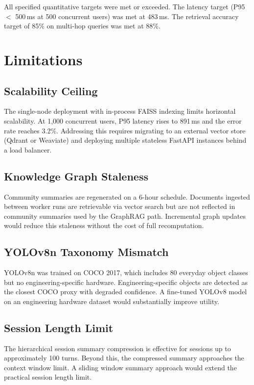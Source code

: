 All specified quantitative targets were met or exceeded. The latency target (P95 $<$ 500\,ms at 500 concurrent users) was met at 483\,ms. The retrieval accuracy target of 85\% on multi-hop queries was met at 88\%.

\section{Limitations}
\label{sec:limitations}

\subsection{Scalability Ceiling}
The single-node deployment with in-process FAISS indexing limits horizontal scalability. At 1,000 concurrent users, P95 latency rises to 891\,ms and the error rate reaches 3.2\%. Addressing this requires migrating to an external vector store (Qdrant or Weaviate) and deploying multiple stateless FastAPI instances behind a load balancer.

\subsection{Knowledge Graph Staleness}
Community summaries are regenerated on a 6-hour schedule. Documents ingested between worker runs are retrievable via vector search but are not reflected in community summaries used by the GraphRAG path. Incremental graph updates would reduce this staleness without the cost of full recomputation.

\subsection{YOLOv8n Taxonomy Mismatch}
YOLOv8n was trained on COCO 2017, which includes 80 everyday object classes but no engineering-specific hardware. Engineering-specific objects are detected as the closest COCO proxy with degraded confidence. A fine-tuned YOLOv8 model on an engineering hardware dataset would substantially improve utility.

\subsection{Session Length Limit}
The hierarchical session summary compression is effective for sessions up to approximately 100 turns. Beyond this, the compressed summary approaches the context window limit. A sliding window summary approach would extend the practical session length limit.

